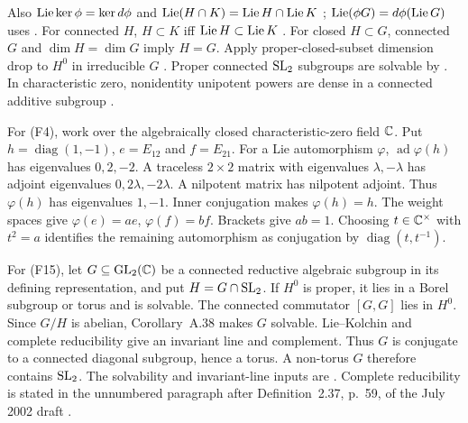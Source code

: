 Also $\operatorname{Lie}\ker\phi=\ker d\phi$ and $\operatorname{Lie}(H\cap K)=\operatorname{Lie} H\cap\operatorname{Lie} K$
\cite[\S12.5, p.~85]{Humphreys1975};
$\operatorname{Lie}(\phi G)=d\phi(\operatorname{Lie} G)$ uses
\cite[\S7.2, proof, p.~105]{Borel1991}.
For connected $H$, $H\subset K$ iff $\operatorname{Lie} H\subset\operatorname{Lie} K$
\cite[\S13.1, Theorem, p.~87]{Humphreys1975}
\cite[\S7.1(2), p.~105]{Borel1991}.
For closed $H\subset G$, connected $G$ and $\dim H=\dim G$ imply $H=G$.
Apply proper-closed-subset dimension drop to $H^0$ in irreducible $G$
\cite[\S3.2, Proposition, p.~25]{Humphreys1975}
\cite[Proposition~1.2 and following paragraph, \mbox{pp.}~46--47]{Borel1991}.
Proper connected $\operatorname{SL}_2$ subgroups are solvable by
\cite[Theorem~4.29, pp.~133--134]{VanDerPutSinger2002Draft}.
In characteristic zero, nonidentity unipotent powers are dense in a connected
additive subgroup \cite[\S2.1, p.~56; \S7.3, Remark, p.~106]{Borel1991}.


For (F4), work over the algebraically closed characteristic-zero field
$\mathbb{C}$. Put $h=\operatorname{diag}(1,-1)$, $e=E_{12}$ and $f=E_{21}$.
For a Lie automorphism $\varphi$, $\operatorname{ad}\varphi(h)$ has
eigenvalues $0,2,-2$. A traceless $2\times2$ matrix with eigenvalues
$\lambda,-\lambda$ has adjoint eigenvalues $0,2\lambda,-2\lambda$. A nilpotent matrix has nilpotent adjoint. Thus $\varphi(h)$ has
eigenvalues $1,-1$. Inner conjugation makes $\varphi(h)=h$.
The weight spaces give $\varphi(e)=ae$, $\varphi(f)=bf$. Brackets give $ab=1$. Choosing $t\in\mathbb{C}^\times$ with $t^2=a$ identifies the
remaining automorphism as conjugation by $\operatorname{diag}(t,t^{-1})$.

For (F15), let $G\subseteq\operatorname{GL}_2(\mathbb{C})$ be a connected reductive
algebraic subgroup in its defining representation, and put $H=G\cap\operatorname{SL}_2$.
If $H^0$ is proper, it lies in a Borel subgroup or torus and is solvable.
The connected commutator $[G,G]$ lies in $H^0$. Since $G/H$ is abelian,
Corollary~A.38 makes $G$ solvable. Lie--Kolchin and complete reducibility
give an invariant line and complement. Thus $G$ is conjugate to a connected
diagonal subgroup, hence a torus. A non-torus $G$ therefore contains $\operatorname{SL}_2$.
The solvability and invariant-line inputs
are \cite[Corollary~A.38, p.~364; Theorem~A.46, p.~367]{VanDerPutSinger2003}.
Complete reducibility is stated in the unnumbered paragraph after
Definition~2.37, p.~59, of the July 2002 draft
\cite{VanDerPutSinger2002Draft}.

